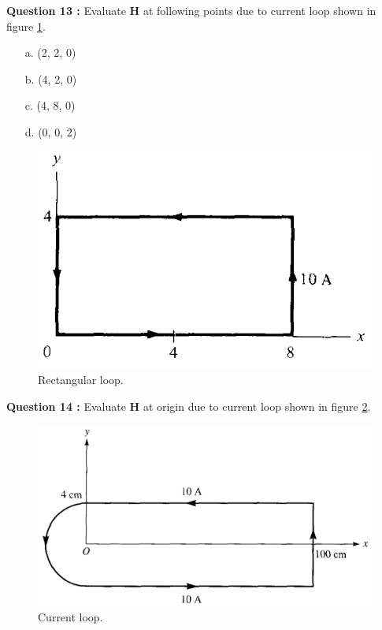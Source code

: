 \documentclass[12pt,a4paper]{article}
\begin{document}
\noindent\textbf{Question 13 \cite[Problem 7.9, page 298]{Sadiku}:} Evaluate \textbf{H} at following points due to current loop shown in figure \ref{rectangular-loop}.
\begin{itemize}
\item[a.] (2, 2, 0)
\item[b.] (4, 2, 0)
\item[c.] (4, 8, 0)
\item[d.] (0, 0, 2)
\end{itemize}
\begin{figure}[H]
\centering
\includegraphics[scale=0.4]{Figure7-30S.png}
\caption{Rectangular loop.}
\label{rectangular-loop}
\end{figure}
\noindent\textbf{Question 14 \cite[Problem 7.9, page 298]{Sadiku}:} Evaluate \textbf{H} at origin due to current loop shown in figure \ref{semi-rectangular-loop}.\\
\begin{figure}[H]
\centering
\includegraphics[scale=0.4]{Figure7-31S.png}
\caption{Current loop.}
\label{semi-rectangular-loop}
\end{figure}
\end{document}
